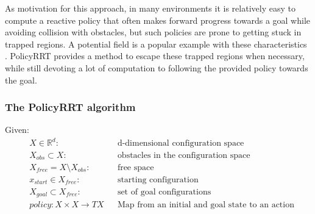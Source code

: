 \documentclass[../thesis.tex]{subfiles}
\begin{document}
As motivation for this approach, in many environments it is relatively easy to compute a reactive policy that often makes forward progress towards a goal while avoiding collision with obstacles,
but such policies are prone to getting stuck in trapped regions.
A potential field is a popular example with these characteristics \cite{koren1991potential}.
PolicyRRT provides a method to escape these trapped regions when necessary, while still devoting a lot of computation to following the provided policy towards the goal.



\subsubsection{The PolicyRRT algorithm}

Given:
\begin{align}
    &X \in \mathbb{R}^d:     &&\text{d-dimensional configuration space}\\
    &X_{obs} \subset X:      &&\text{obstacles in the configuration space}\\
    &X_{free} = X \setminus X_{obs}:   &&\text{free space}\\
    &x_{start} \in X_{free}:  &&\text{starting configuration}\\
    &X_{goal} \subset X_{free}: &&\text{set of goal configurations}\\
    &policy: X \times X \rightarrow TX &&\text{Map from an initial and goal state to an action}
\end{align}
\end{document}
